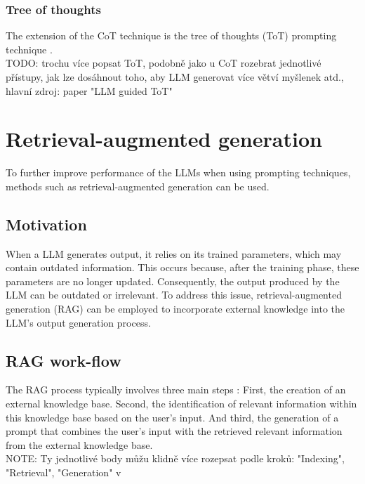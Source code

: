 \subsubsection{Tree of thoughts}

The extension of the CoT technique is the tree of thoughts (ToT) prompting technique \cite{Long2023}. \\

TODO: trochu více popsat ToT, podobně jako u CoT rozebrat jednotlivé přístupy, jak lze dosáhnout toho, aby LLM generovat více větví myšlenek atd., hlavní zdroj: paper "LLM guided ToT" \\


\section{Retrieval-augmented generation}

To further improve performance of the LLMs when using prompting techniques, methods such as retrieval-augmented generation can be used.

\subsection{Motivation}

When a LLM generates output, it relies on its trained parameters, which may contain outdated information. This occurs because, after the training phase, these parameters are no longer updated. Consequently, the output produced by the LLM can be outdated or irrelevant. To address this issue, retrieval-augmented generation (RAG) can be employed to incorporate external knowledge into the LLM's output generation process.


\subsection{RAG work-flow}

The RAG process typically involves three main steps \cite{Gao2023}: First, the creation of an external knowledge base. Second, the identification of relevant information within this knowledge base based on the user's input. And third, the generation of a prompt that combines the user's input with the retrieved relevant information from the external knowledge base. \\

NOTE: Ty jednotlivé body můžu klidně více rozepsat podle kroků: "Indexing", "Retrieval", "Generation" v \cite{Gao2023} \\

